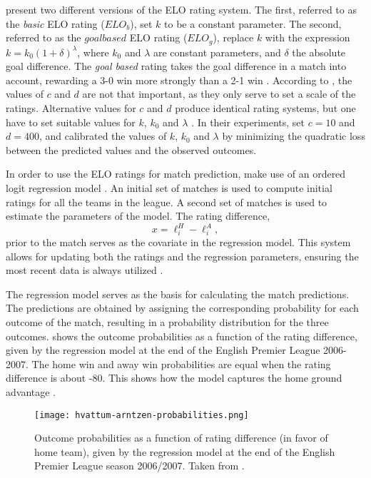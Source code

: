 \citet{bib:hvattum-arntzen-2010} present two different versions of the ELO rating system. The first, referred to as the \textit{basic} ELO rating ($ELO_{b}$), set $k$ to be a constant parameter. The second, referred to as the $goal based$ ELO rating ($ELO_{g}$), replace $k$ with the expression $k = k_{0}(1 + \delta)^{\lambda}$, where $k_ {0}$ and $\lambda$ are constant parameters, and $\delta$ the absolute goal difference. The \textit{goal based} rating takes the goal difference in a match into account, rewarding a 3-0 win more strongly than a 2-1 win \citep{bib:hvattum-arntzen-2010}. According to \citet{bib:hvattum-arntzen-2010}, the values of $c$ and $d$ are not that important, as they only serve to set a scale of the ratings. Alternative values for $c$ and $d$ produce identical rating systems, but one have to set suitable values for $k$, $k_{0}$ and $\lambda$ \citep{bib:hvattum-arntzen-2010}. In their experiments, \citet{bib:hvattum-arntzen-2010} set $c=10$ and $d=400$, and calibrated the values of $k$, $k_{0}$ and $\lambda$ by minimizing the quadratic loss between the predicted values and the observed outcomes.

In order to use the ELO ratings for match prediction, \citet{bib:hvattum-arntzen-2010} make use of an ordered logit regression model \citep{bib:greene-1999}. An initial set of matches is used to compute initial ratings for all the teams in the league. A second set of matches is used to estimate the parameters of the model. The rating difference,
\begin{equation*}
    x = \ell_{i}^{H} - \ell_{i}^{A},
\end{equation*}
prior to the match serves as the covariate in the regression model. This system allows for updating both the ratings and the regression parameters, ensuring the most recent data is always utilized \citep{bib:hvattum-arntzen-2010}. 

The regression model serves as the basis for calculating the match predictions. The predictions are obtained by assigning the corresponding probability for each outcome of the match, resulting in a probability distribution for the three outcomes.  shows the outcome probabilities as a function of the rating difference, given by the regression model at the end of the English Premier League 2006-2007. The home win and away win probabilities are equal when the rating difference is about -80. This shows how the model captures the home ground advantage \citep{bib:hvattum-arntzen-2010}.
\begin{figure}[H]
    \centering
    \texttt{[image: hvattum-arntzen-probabilities.png]}
    \caption{Outcome probabilities as a function of rating difference (in favor of home team), given by the regression model at the end of the English Premier League season 2006/2007. Taken from \citet{bib:hvattum-arntzen-2010}.}
    \label{fig:hvattum-arntzen-probabilities}
\end{figure}

